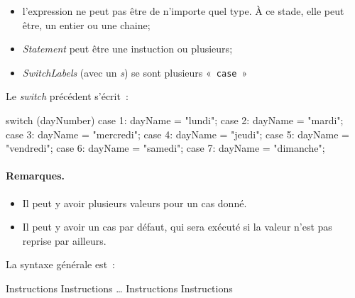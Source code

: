 	\begin{itemize}
		\item l'expression ne peut pas être de n'importe quel type. À ce stade, 
			elle peut être, un entier ou une chaine;
		\item \textit{Statement} peut être une instuction ou plusieurs;
		\item \textit{SwitchLabels} (avec un \textit{s}) se sont plusieurs 
			«~\texttt{case}~»
	\end{itemize}

	Le \textit{switch} précédent s'écrit~:

	\begin{java}
switch (dayNumber) {
	case 1: 
		dayName = "lundi"; 
	case 2: 
		dayName = "mardi"; 
	case 3: 
		dayName = "mercredi"; 
	case 4: 
		dayName = "jeudi"; 
	case 5: 
		dayName = "vendredi"; 
	case 6: 
		dayName = "samedi"; 
	case 7: 
		dayName = "dimanche";
}
	\end{java}
		
	\paragraph{Remarques.}
	\begin{itemize}
	\item
		Il peut y avoir plusieurs valeurs pour un cas donné.
	\item
		Il peut y avoir un cas par défaut, 
		qui sera exécuté si la valeur n’est pas reprise par ailleurs.
	\end{itemize}
	
	\pagebreak[4]
	La syntaxe générale est~:
	
	\begin{pseudocode}
				\Stmt Instructions
				\Stmt Instructions
			\Empty \dots
				\Stmt Instructions
				\Stmt Instructions
		\EndSwitch
	\end{pseudocode}
	
	

